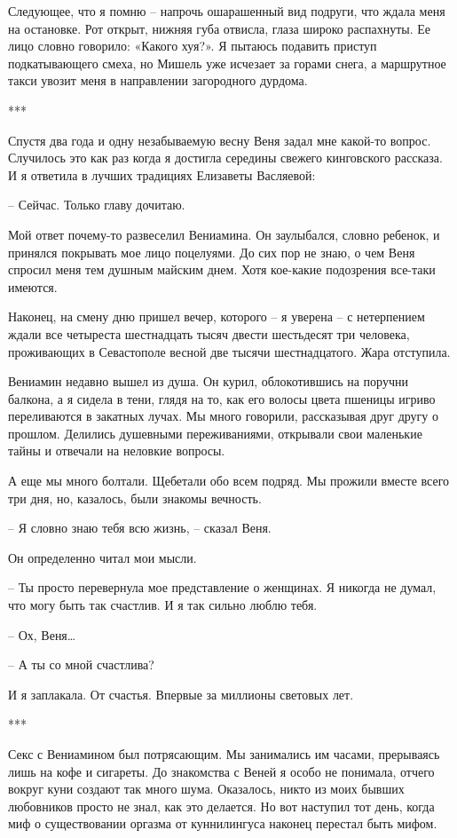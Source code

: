 \documentclass[
]{book}
\begin{document}
Следующее, что я помню -- напрочь ошарашенный вид подруги, что ждала меня на остановке. Рот открыт, нижняя губа отвисла, глаза широко распахнуты. Ее лицо словно говорило: «Какого хуя?». Я пытаюсь подавить приступ подкатывающего смеха, но Мишель уже исчезает за горами снега, а маршрутное такси увозит меня в направлении загородного дурдома.

***

Спустя два года и одну незабываемую весну Веня задал мне какой-то вопрос. Случилось это как раз когда я достигла середины свежего кинговского рассказа. И я ответила в лучших традициях Елизаветы Васляевой:

-- Сейчас. Только главу дочитаю.

Мой ответ почему-то развеселил Вениамина. Он заулыбался, словно ребенок, и принялся покрывать мое лицо поцелуями. До сих пор не знаю, о чем Веня спросил меня тем душным майским днем. Хотя кое-какие подозрения все-таки имеются.

Наконец, на смену дню пришел вечер, которого -- я уверена -- с нетерпением ждали все четыреста шестнадцать тысяч двести шестьдесят три человека, проживающих в Севастополе весной две тысячи шестнадцатого. Жара отступила.

Вениамин недавно вышел из душа. Он курил, облокотившись на поручни балкона, а я сидела в тени, глядя на то, как его волосы цвета пшеницы игриво переливаются в закатных лучах. Мы много говорили, рассказывая друг другу о прошлом. Делились душевными переживаниями, открывали свои маленькие тайны и отвечали на неловкие вопросы.

А еще мы много болтали. Щебетали обо всем подряд. Мы прожили вместе всего три дня, но, казалось, были знакомы вечность.

-- Я словно знаю тебя всю жизнь, -- сказал Веня.

Он определенно читал мои мысли.

-- Ты просто перевернула мое представление о женщинах. Я никогда не думал, что могу быть так счастлив. И я так сильно люблю тебя.

-- Ох, Веня\ldots{}

-- А ты со мной счастлива?

И я заплакала. От счастья. Впервые за миллионы световых лет.

***

Секс с Вениамином был потрясающим. Мы занимались им часами, прерываясь лишь на кофе и сигареты. До знакомства с Веней я особо не понимала, отчего вокруг куни создают так много шума. Оказалось, никто из моих бывших любовников просто не знал, как это делается. Но вот наступил тот день, когда миф о существовании оргазма от куннилингуса наконец перестал быть мифом.
\end{document}
